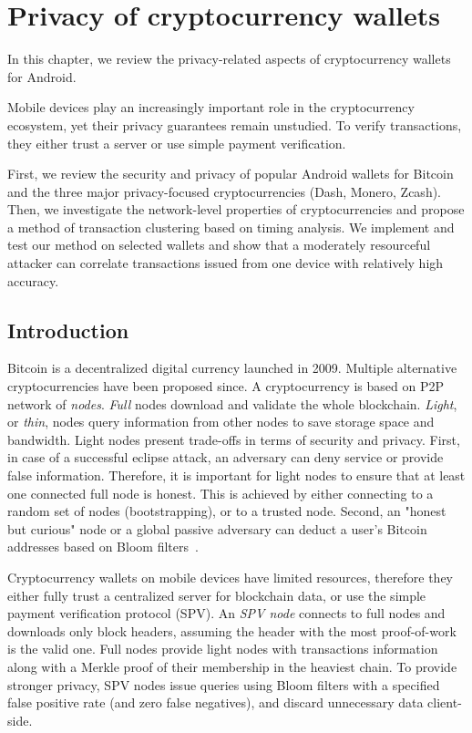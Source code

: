 \chapter{Privacy of cryptocurrency wallets}

\label{Chapter04_Wallets}

In this chapter, we review the privacy-related aspects of cryptocurrency wallets for Android.

Mobile devices play an increasingly important role in the cryptocurrency ecosystem, yet their privacy guarantees remain unstudied.
To verify transactions, they either trust a server or use simple payment verification.

First, we review the security and privacy of popular Android wallets for Bitcoin and the three major privacy-focused cryptocurrencies (Dash, Monero, Zcash).
Then, we investigate the network-level properties of cryptocurrencies and propose a method of transaction clustering based on timing analysis.
We implement and test our method on selected wallets and show that a moderately resourceful attacker can correlate transactions issued from one device with relatively high accuracy.

\section{Introduction}

Bitcoin is a decentralized digital currency launched in 2009.
Multiple alternative cryptocurrencies have been proposed since.
A cryptocurrency is based on P2P network of \textit{nodes}.
\textit{Full} nodes download and validate the whole blockchain.
\textit{Light}, or \textit{thin}, nodes query information from other nodes to save storage space and bandwidth.
Light nodes present trade-offs in terms of security and privacy.
First, in case of a successful eclipse attack, an adversary can deny service or provide false information.
Therefore, it is important for light nodes to ensure that at least one connected full node is honest.
This is achieved by either connecting to a random set of nodes (bootstrapping), or to a trusted node.
Second, an "honest but curious" node or a global passive adversary can deduct a user's Bitcoin addresses based on Bloom filters~\cite{Gervais2014}.

Cryptocurrency wallets on mobile devices have limited resources, therefore they either fully trust a centralized server for blockchain data, or use the simple payment verification protocol (SPV).
An \textit{SPV node} connects to full nodes and downloads only block headers, assuming the header with the most proof-of-work is the valid one.
Full nodes provide light nodes with transactions information along with a Merkle proof of their membership in the heaviest chain.
To provide stronger privacy, SPV nodes issue queries using Bloom filters with a specified false positive rate (and zero false negatives), and discard unnecessary data client-side.

